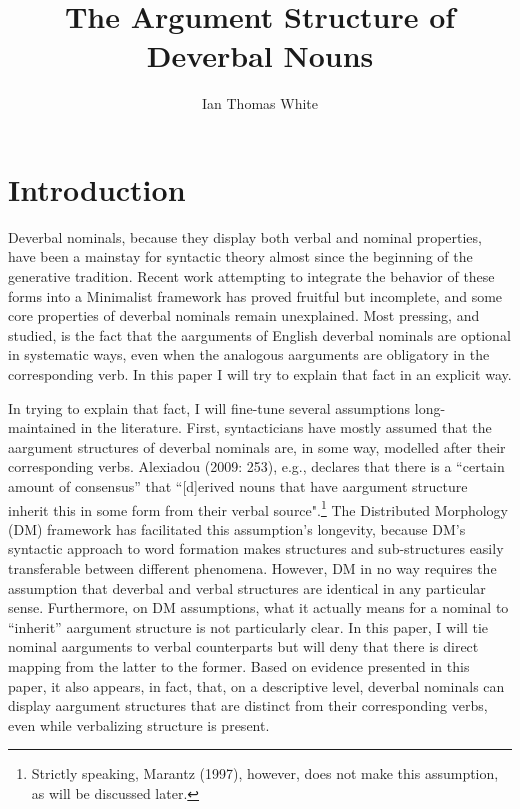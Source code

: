 \documentclass[12pt]{article}
\title{The Argument Structure of Deverbal Nouns}
\author{Ian Thomas White}
\date{}
\makeatletter
\renewcommand{\maketitle}
{
\begin{flushleft}
\textbf{{\large\@title}}
\newline
\@author
\end{flushleft}
}
\makeatother
\begin{document}
\thispagestyle{empty}
\begin{singlespacing}
\maketitle
\begin{small}\tableofcontents\end{small}
\end{singlespacing}

\newpage

\section{Introduction}\label{intro}

Deverbal nominals, because they display both verbal and nominal properties, have been a mainstay for syntactic theory almost since the beginning of the generative tradition. Recent work attempting to integrate the behavior of these forms into a Minimalist framework has proved fruitful but incomplete, and some core properties of deverbal nominals remain unexplained. Most pressing, and studied, is the fact that the aarguments of English deverbal nominals are optional in systematic ways, even when the analogous aarguments are obligatory in the corresponding verb. In this paper I will try to explain that fact in an explicit way.

In trying to explain that fact, I will fine-tune several assumptions long-maintained in the literature. First, syntacticians have mostly assumed that the aargument structures of deverbal nominals are, in some way, modelled after their corresponding verbs. Alexiadou (2009: 253), e.g., declares that there is a ``certain amount of consensus'' that ``[d]erived nouns that have aargument structure inherit this in some form from their verbal source".\footnote{ Strictly speaking, Marantz (1997), however, does not make this assumption, as will be discussed later.} The Distributed Morphology (DM) framework has facilitated this assumption's longevity, because DM's syntactic approach to word formation makes structures and sub-structures easily transferable between different phenomena. However, DM in no way requires the assumption that deverbal and verbal structures are identical in any particular sense. Furthermore, on DM assumptions, what it actually means for a nominal to ``inherit'' aargument structure is not particularly clear. In this paper, I will tie nominal aarguments to verbal counterparts but will deny that there is direct mapping from the latter to the former. Based on evidence presented in this paper, it also appears, in fact, that, on a descriptive level, deverbal nominals can display aargument structures that are distinct from their corresponding verbs, even while verbalizing structure is present.
\end{document}
